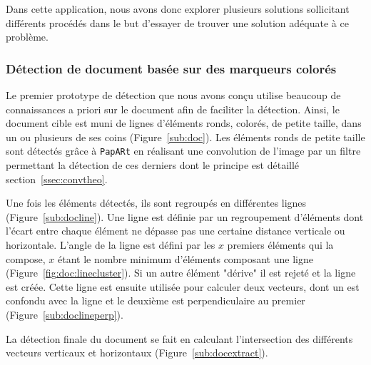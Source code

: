 Dans cette application, nous avons donc explorer plusieurs solutions sollicitant différents procédés dans le but d'essayer de trouver une solution adéquate à ce problème.

\subsubsection{Détection de document basée sur des marqueurs colorés} Le premier prototype de détection que nous avons conçu utilise beaucoup de connaissances a priori sur le document afin de faciliter la détection. Ainsi, le document cible est muni de lignes d'éléments ronds, colorés, de petite taille, dans un ou plusieurs de ses coins (Figure~\ref{sub:doc}). Les éléments ronds de petite taille sont détectés grâce à \texttt{PapARt} en réalisant une convolution de l'image par un filtre permettant la détection de ces derniers dont le principe est détaillé section~\ref{ssec:convtheo}.

Une fois les éléments détectés, ils sont regroupés en différentes lignes (Figure~\ref{sub:docline}).
Une ligne est définie par un regroupement d'éléments dont l'écart entre chaque élément ne dépasse pas une certaine distance verticale ou horizontale. L'angle de la ligne est défini par les $x$ premiers éléments qui la compose, $x$ étant le nombre minimum d'éléments composant une ligne (Figure~\ref{fig:doc:linecluster}). Si un autre élément "dérive" il est rejeté et la ligne est créée. Cette ligne est ensuite utilisée pour calculer deux vecteurs, dont un est confondu avec la ligne et le deuxième est perpendiculaire au premier (Figure~\ref{sub:doclineperp}).

La détection finale du document se fait en calculant l'intersection des différents vecteurs verticaux et horizontaux (Figure~\ref{sub:docextract}).

